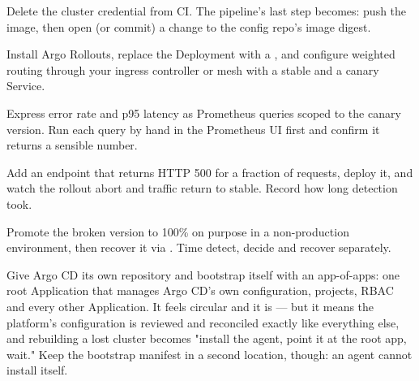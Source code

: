 Delete the cluster credential from CI. The pipeline's last step becomes: push the image, then open (or commit) a change to the config repo's image digest.

Install Argo Rollouts, replace the Deployment with a , and configure weighted routing through your ingress controller or mesh with a stable and a canary Service.

Express error rate and p95 latency as Prometheus queries scoped to the canary version. Run each query by hand in the Prometheus UI first and confirm it returns a sensible number.

Add an endpoint that returns HTTP 500 for a fraction of requests, deploy it, and watch the rollout abort and traffic return to stable. Record how long detection took.

Promote the broken version to 100\% on purpose in a non-production environment, then recover it via . Time detect, decide and recover separately.

\begin{prodtip}
Give Argo CD its own repository and bootstrap itself with an app-of-apps: one root Application that manages Argo CD's own configuration, projects, RBAC and every other Application. It feels circular and it is --- but it means the platform's configuration is reviewed and reconciled exactly like everything else, and rebuilding a lost cluster becomes "install the agent, point it at the root app, wait." Keep the bootstrap manifest in a second location, though: an agent cannot install itself.
\end{prodtip}

